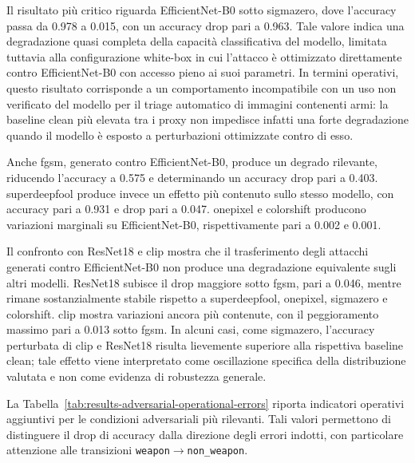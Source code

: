 Il risultato più critico riguarda EfficientNet-B0 sotto \gls{sigmazero}, dove
l'accuracy passa da 0.978 a 0.015, con un accuracy drop pari a 0.963. Tale valore
indica una degradazione quasi completa della capacità classificativa del modello,
limitata tuttavia alla configurazione white-box in cui l'attacco è ottimizzato
direttamente contro EfficientNet-B0 con accesso pieno ai suoi parametri. In
termini operativi, questo risultato corrisponde a un comportamento incompatibile
con un uso non verificato del modello per il triage automatico di immagini
contenenti armi: la baseline clean più elevata tra i proxy non impedisce infatti
una forte degradazione quando il modello è esposto a perturbazioni ottimizzate
contro di esso.

Anche \gls{fgsm}, generato contro EfficientNet-B0, produce un degrado rilevante,
riducendo l'accuracy a 0.575 e determinando un accuracy drop pari a 0.403.
\gls{superdeepfool} produce invece un effetto più contenuto sullo stesso modello,
con accuracy pari a 0.931 e drop pari a 0.047. \gls{onepixel} e \gls{colorshift}
producono variazioni marginali su EfficientNet-B0, rispettivamente pari a 0.002 e
0.001.

Il confronto con ResNet18 e \gls{clip} mostra che il trasferimento degli attacchi
generati contro EfficientNet-B0 non produce una degradazione equivalente sugli
altri modelli. ResNet18 subisce il drop maggiore sotto \gls{fgsm}, pari a 0.046,
mentre rimane sostanzialmente stabile rispetto a \gls{superdeepfool},
\gls{onepixel}, \gls{sigmazero} e \gls{colorshift}. \gls{clip} mostra variazioni
ancora più contenute, con il peggioramento massimo pari a 0.013 sotto
\gls{fgsm}. In alcuni casi, come \gls{sigmazero}, l'accuracy perturbata di
\gls{clip} e ResNet18 risulta lievemente superiore alla rispettiva baseline
clean; tale effetto viene interpretato come oscillazione specifica della
distribuzione valutata e non come evidenza di robustezza generale.

La Tabella~\ref{tab:results-adversarial-operational-errors} riporta indicatori
operativi aggiuntivi per le condizioni adversariali più rilevanti. Tali valori
permettono di distinguere il drop di accuracy dalla direzione degli errori
indotti, con particolare attenzione alle transizioni
\texttt{weapon}\(\rightarrow\)\texttt{non\_weapon}.

